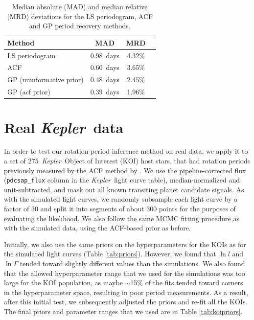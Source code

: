 \documentclass[useAMS, usenatbib, preprint, 12pt]{aastex}
\newcommand{\Kepler}{{\it Kepler}}
\newcommand{\kepler}{\Kepler}
\newcommand{\nkoimcq}{275}
\newcommand{\acfMAD}{0.60}
\newcommand{\percentacfMAD}{3.65}
\newcommand{\pgramMAD}{0.98}
\newcommand{\percentpgramMAD}{4.32}
\newcommand{\gpMADnp}{0.48}
\newcommand{\percentgpMADnp}{2.45}
\newcommand{\gpMAD}{0.39}
\newcommand{\percentgpMAD}{1.96}
\begin{document}
\begin{table}
\begin{center}
    \caption{Median absolute (MAD) and median relative (MRD) deviations for
    the LS periodogram, ACF and GP period recovery methods.}
\begin{tabular}{lccc}
Method & MAD & MRD \\
    \hline
    LS periodogram & \pgramMAD\ days & \percentpgramMAD \% \\
    ACF & \acfMAD\ days & \percentacfMAD \% \\
    GP (uninformative prior) & \gpMADnp\ days & \percentgpMADnp \% \\
    GP (acf prior) & \gpMAD\ days & \percentgpMAD \% \\
\end{tabular}
\end{center}
\end{table}
\label{tab:MADs}

\section{Real \kepler\ data}
\label{sec:kepler}

In order to test our rotation period inference method on real data,
we apply it to a set of \nkoimcq\ \Kepler\ Object of Interest (KOI)
host stars, that had rotation periods previously measured by
the ACF method by \citet{Mcquillan2013}.  We use the pipeline-corrected flux
(\texttt{pdcsap\_flux} column in the \Kepler\ light curve table), median-normalized
and unit-subtracted, and mask out all known transiting planet candidate signals.
As with the simulated light curves, we randomly subsample each
light curve by a factor of 30 and split it into segments of about 300 points
for the purposes of evaluating the likelihood.  We also follow the same MCMC
fitting procedure as with the simulated data, using the ACF-based prior as before.

Initially, we also use the same priors on the hyperparameters for the KOIs
as for the simulated light curves (Table \ref{tab:priors}).
However, we found that $\ln l$ and $\ln \Gamma$ tended toward slightly different
values than the simulations.  We also found that the allowed hyperparameter
range that we used for the simulations was too large for the KOI population,
as maybe $\sim$15\% of the fits tended toward corners in the hyperparameter
space, resulting in poor period measurements.  As a result, after this initial
test, we subsequently adjusted the priors and re-fit all the KOIs.
The final priors and parameter ranges that we used are in Table \ref{tab:koipriors}.
\end{document}
